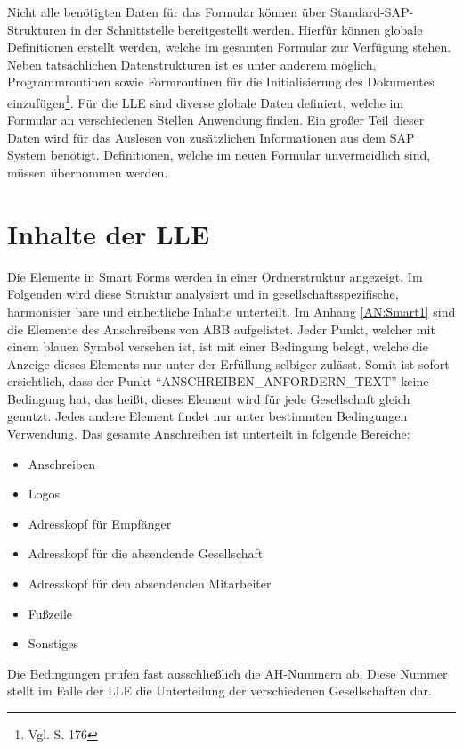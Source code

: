 	Nicht alle benötigten Daten für das Formular können über Standard-SAP-Strukturen in der Schnittstelle bereitgestellt werden. Hierfür können globale Definitionen erstellt werden, welche im gesamten Formular zur Verfügung stehen. Neben tatsächlichen Datenstrukturen ist es unter anderem möglich, Programmroutinen sowie Formroutinen für die Initialisierung des Dokumentes einzufügen\footnote{Vgl. \cite{Hertleif.2003} S. 176}. Für die \ac{LLE} sind diverse globale Daten definiert, welche im Formular an verschiedenen Stellen Anwendung finden. Ein großer Teil dieser Daten wird für das Auslesen von zusätzlichen Informationen aus dem SAP System benötigt. Definitionen, welche im neuen Formular unvermeidlich sind, müssen übernommen werden.
	
	
	\section{Inhalte der \acs{LLE}}
	
	Die Elemente in Smart Forms werden in einer Ordnerstruktur angezeigt. Im Folgenden wird diese Struktur analysiert und in gesellschaftsspezifische, harmonisier bare und einheitliche Inhalte unterteilt.
	Im Anhang \ref{AN:Smart1} sind die Elemente des Anschreibens von ABB aufgelistet. Jeder Punkt, welcher mit einem blauen Symbol versehen ist, ist mit einer Bedingung belegt, welche die Anzeige dieses Elements nur unter der Erfüllung selbiger zulässt. Somit ist sofort ersichtlich, dass der Punkt "`ANSCHREIBEN\_ANFORDERN\_TEXT"' keine Bedingung hat, das heißt, dieses Element wird für jede Gesellschaft gleich genutzt. Jedes andere Element findet nur unter bestimmten Bedingungen Verwendung. Das gesamte Anschreiben ist unterteilt in folgende Bereiche:
	
	\begin{itemize}
		\item Anschreiben
		\item Logos
		\item Adresskopf für Empfänger
		\item Adresskopf für die absendende Gesellschaft
		\item Adresskopf für den absendenden Mitarbeiter
		\item Fußzeile
		\item Sonstiges
	\end{itemize}

	Die Bedingungen prüfen fast ausschließlich die \ac{AH}-Nummern ab. Diese Nummer stellt im Falle der \ac{LLE} die Unterteilung der verschiedenen Gesellschaften dar.
\FloatBarrier


